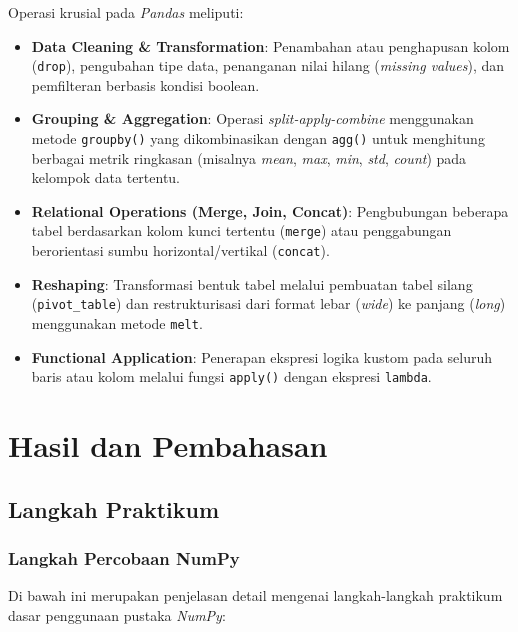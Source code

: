 \documentclass[a4paper,oneside,12pt]{report}
\begin{document}
Operasi krusial pada \textit{Pandas} meliputi:
\begin{itemize}
    \item \textbf{Data Cleaning \& Transformation}: Penambahan atau penghapusan kolom (\texttt{drop}), pengubahan tipe data, penanganan nilai hilang (\textit{missing values}), dan pemfilteran berbasis kondisi boolean.
    \item \textbf{Grouping \& Aggregation}: Operasi \textit{split-apply-combine} menggunakan metode \texttt{groupby()} yang dikombinasikan dengan \texttt{agg()} untuk menghitung berbagai metrik ringkasan (misalnya \textit{mean}, \textit{max}, \textit{min}, \textit{std}, \textit{count}) pada kelompok data tertentu.
    \item \textbf{Relational Operations (Merge, Join, Concat)}: Pengbubungan beberapa tabel berdasarkan kolom kunci tertentu (\texttt{merge}) atau penggabungan berorientasi sumbu horizontal/vertikal (\texttt{concat}).
    \item \textbf{Reshaping}: Transformasi bentuk tabel melalui pembuatan tabel silang (\texttt{pivot\_table}) dan restrukturisasi dari format lebar (\textit{wide}) ke panjang (\textit{long}) menggunakan metode \texttt{melt}.
    \item \textbf{Functional Application}: Penerapan ekspresi logika kustom pada seluruh baris atau kolom melalui fungsi \texttt{apply()} dengan ekspresi \texttt{lambda}.
\end{itemize}
\clearpage

\chapter{Hasil dan Pembahasan}

\section{Langkah Praktikum}

\subsection{Langkah Percobaan NumPy}
Di bawah ini merupakan penjelasan detail mengenai langkah-langkah praktikum dasar penggunaan pustaka \textit{NumPy}:
\end{document}
